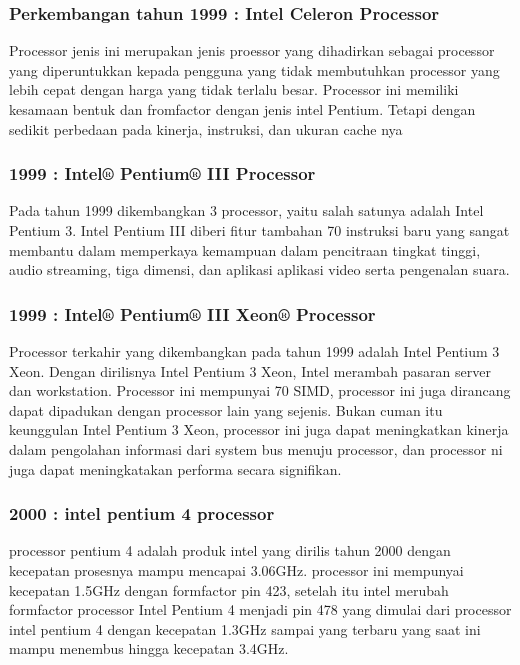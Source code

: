  			\subsubsection{Perkembangan tahun 1999 : Intel Celeron Processor}
 	Processor jenis ini merupakan jenis proessor yang dihadirkan sebagai processor yang diperuntukkan kepada pengguna yang tidak membutuhkan processor yang lebih cepat dengan harga yang tidak terlalu besar. Processor ini memiliki kesamaan bentuk dan fromfactor dengan jenis intel Pentium. Tetapi dengan sedikit perbedaan pada kinerja, instruksi, dan ukuran cache nya


 			\subsubsection{1999 : Intel® Pentium® III Processor}
 	Pada tahun 1999 dikembangkan 3 processor, yaitu salah satunya adalah Intel Pentium 3. Intel Pentium III diberi fitur tambahan 70 instruksi baru yang sangat membantu dalam memperkaya kemampuan dalam pencitraan tingkat tinggi, audio streaming, tiga dimensi, dan aplikasi aplikasi video serta pengenalan suara. 
 			\subsubsection{1999 : Intel® Pentium® III Xeon® Processor}
 	Processor terkahir yang dikembangkan pada tahun 1999 adalah Intel Pentium 3 Xeon. Dengan dirilisnya Intel Pentium 3 Xeon, Intel merambah pasaran server dan workstation. Processor ini mempunyai 70 SIMD, processor ini juga dirancang dapat dipadukan dengan processor lain yang sejenis. Bukan cuman itu keunggulan Intel Pentium 3 Xeon, processor ini juga dapat meningkatkan kinerja dalam pengolahan informasi dari system bus menuju processor, dan processor ni juga dapat meningkatakan performa secara signifikan.


			\subsubsection{2000 : intel pentium 4 processor}
 	processor pentium 4 adalah produk intel yang dirilis tahun 2000 dengan kecepatan prosesnya mampu mencapai 3.06GHz. processor ini mempunyai kecepatan 1.5GHz dengan formfactor pin 423, setelah itu intel merubah formfactor processor Intel Pentium 4 menjadi pin 478 yang dimulai dari processor intel pentium 4 dengan kecepatan 1.3GHz sampai yang terbaru yang saat ini mampu menembus hingga kecepatan 3.4GHz.


